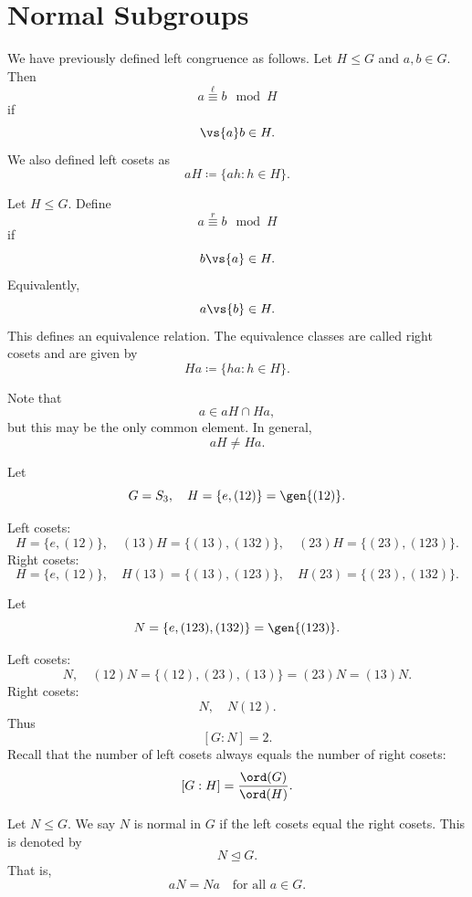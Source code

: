 
\section{Normal Subgroups}

We have previously defined left congruence as follows.
Let $H\leq G$ and $a,b\in G$.
Then
\[
    a\overset{\ell}{\equiv} b\mod H
\]
if
\[
    \vs{a}b\in H.
\]
We also defined left cosets as
\[
    aH\coloneqq \{ah:h\in H\}.
\]

\begin{definition}
    Let $H\leq G$.
    Define
    \[
        a\overset{r}{\equiv} b\mod H
    \]
    if
    \[
        b\vs{a}\in H.
    \]
    Equivalently,
    \[
        a\vs{b}\in H.
    \]
    This defines an equivalence relation.
    The equivalence classes are called right cosets and are given by
    \[
        Ha\coloneqq \{ha:h\in H\}.
    \]
\end{definition}

Note that
\[
    a\in aH\cap Ha,
\]
but this may be the only common element.
In general,
\[
    aH\neq Ha.
\]

\begin{example}
    Let
    \[
        G=S_3,
        \quad
        H=\{e,(12)\}=\gen{(12)}.
    \]
\end{example}

Left cosets:
\[
    H=\{e,(12)\},
    \quad
    (13)H=\{(13),(132)\},
    \quad
    (23)H=\{(23),(123)\}.
\]
Right cosets:
\[
    H=\{e,(12)\},
    \quad
    H(13)=\{(13),(123)\},
    \quad
    H(23)=\{(23),(132)\}.
\]

\begin{example}
    Let
    \[
        N=\{e,(123),(132)\}=\gen{(123)}.
    \]
\end{example}

Left cosets:
\[
    N,
    \quad
    (12)N=\{(12),(23),(13)\}=(23)N=(13)N.
\]
Right cosets:
\[
    N,
    \quad
    N(12).
\]
Thus
\[
    [G:N]=2.
\]
Recall that the number of left cosets always equals the number of right cosets:
\[
    [G:H]=\frac{\ord(G)}{\ord(H)}.
\]

\begin{definition}
    Let $N\leq G$.
    We say $N$ is normal in $G$ if the left cosets equal the right cosets.
    This is denoted by
    \[
        N\trianglelefteq G.
    \]
    That is,
    \[
        aN=Na
        \quad\text{for all }a\in G.
    \]
\end{definition}

